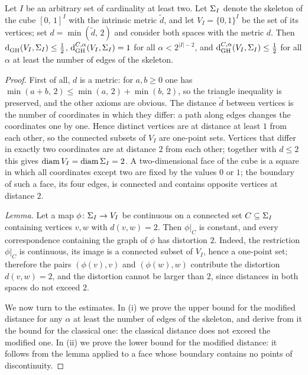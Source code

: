   \begin{example}\label{example: cube skeleton}
    Let $I$ be an arbitrary set of cardinality at least two.
    Let $\S_I$ denote the skeleton of the cube ${[0,\, 1]}^I$ with the intrinsic metric $\tilde d$, and let $V_I = {\{0, 1\}}^I$ be the set of its vertices; set $d = \min(\tilde d,\, 2)$ and consider both spaces with the metric $d$.
    Then $\dGH{}(V_I, \S_I) \le \frac12$, $\dGH{C,\alpha}(V_I, \S_I) = 1$ for all $\alpha < 2^{|I|-2}$, and $\dGH{C,\alpha}(V_I, \S_I) \le \frac12$ for all $\alpha$ at least the number of edges of the skeleton.
  \end{example}
  \begin{proof}
    First of all, $d$ is a metric: for $a, b \ge 0$ one has $\min(a + b,\, 2) \le \min(a,\, 2) + \min(b,\, 2)$, so the triangle inequality is preserved, and the other axioms are obvious.
    The distance $\tilde d$ between vertices is the number of coordinates in which they differ: a path along edges changes the coordinates one by one.
    Hence distinct vertices are at distance at least $1$ from each other, so the connected subsets of $V_I$ are one-point sets.
    Vertices that differ in exactly two coordinates are at distance $2$ from each other; together with $d \le 2$ this gives $\diam V_I = \diam \S_I = 2$.
    A two-dimensional face of the cube is a square in which all coordinates except two are fixed by the values $0$ or $1$; the boundary of such a face, its four edges, is connected and contains opposite vertices at distance $2$.

    \emph{Lemma.}
    Let a map $\phi \: \S_I \to V_I$ be continuous on a connected set $C \subseteq \S_I$ containing vertices $v, w$ with $d(v, w) = 2$.
    Then $\phi|_C$ is constant, and every correspondence containing the graph of $\phi$ has distortion $2$.
    Indeed, the restriction $\phi|_C$ is continuous, its image is a connected subset of $V_I$, hence a one-point set; therefore the pairs $(\phi(v), v)$ and $(\phi(w), w)$ contribute the distortion $d(v, w) = 2$, and the distortion cannot be larger than $2$, since distances in both spaces do not exceed $2$.

    We now turn to the estimates.
    In (i) we prove the upper bound for the modified distance for any $\alpha$ at least the number of edges of the skeleton, and derive from it the bound for the classical one: the classical distance does not exceed the modified one.
    In (ii) we prove the lower bound for the modified distance: it follows from the lemma applied to a face whose boundary contains no points of discontinuity.


\end{proof}
